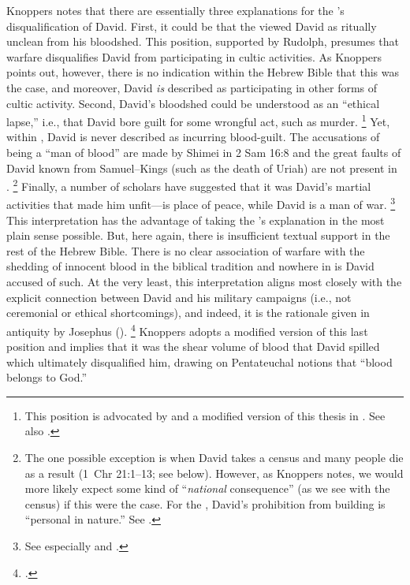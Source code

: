 Knoppers notes that there are essentially three explanations for the \chronicler's disqualification of David. First, it could be that the \chronicler viewed David as ritually unclean from his bloodshed. This position, supported by Rudolph, presumes that warfare disqualifies David from participating in cultic activities.%
    \autocite[151]{rudolph1955}
As Knoppers points out, however, there is no indication within the Hebrew Bible that this was the case, and moreover, David \emph{is} described as participating in other forms of cultic activity.\autocite[772]{knoppers2007} Second, David's bloodshed could be understood as an ``ethical lapse,'' i.e., that David bore guilt for some wrongful act, such as murder.%
    \footnote{This position is advocated by \cite[53]{dirksen_jsot1996} and a modified version of this thesis in \cite{kelly_jsot1998}. See also \cite{braun_jbl1976}.}
Yet, within \chronicles, David is never described as incurring blood-guilt. The accusations of being a ``man of blood'' are made by Shimei in 2 Sam 16:8 and the great faults of David known from Samuel--Kings (such as the death of Uriah) are not present in \chronicles.%
    \footnote{The one possible exception is when David takes a census and many people die as a result (1~Chr 21:1--13; see below). However, as Knoppers notes, we would more likely expect some kind of ``\emph{national} consequence'' (as we see with the census) if this were the case. For the \chronicler, David's prohibition from building \thetemple is ``personal in nature.'' See \cite[772--773]{knoppers2007}.}
Finally, a number of scholars have suggested that it was David's martial activities that made him unfit---\thetemple is place of peace, while David is a man of war.%
    \footnote{See especially \cite[396--397]{japhet1993} and \cite{mckenzie_graham-etal1999}.}
This interpretation has the advantage of taking the \chronicler's explanation in the most plain sense possible. But, here again, there is insufficient textual support in the rest of the Hebrew Bible. There is no clear association of warfare with the shedding of innocent blood in the biblical tradition and nowhere in \chronicles is David accused of such. At the very least, this interpretation aligns most closely with the explicit connection between David and his military campaigns (i.e., not ceremonial or ethical shortcomings), and indeed, it is the rationale given in antiquity by Josephus ().%
    \footnote{\Cite[773]{knoppers2007}.}
Knoppers adopts a modified version of this last position and implies that it was the shear volume of blood that David spilled which ultimately disqualified him, drawing on Pentateuchal notions that ``blood belongs to God.''\autocite[774]{knoppers2007}

